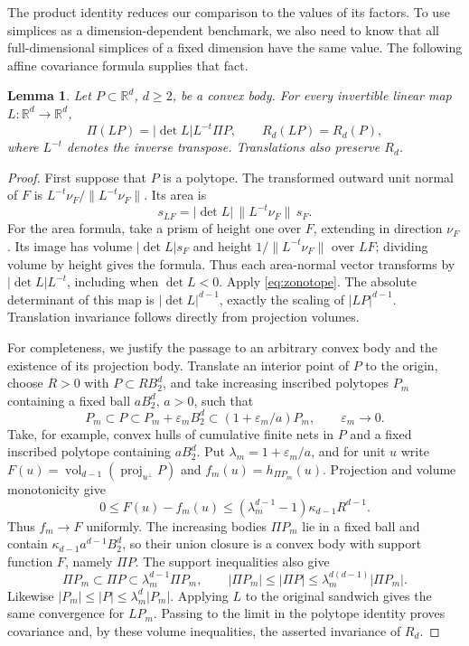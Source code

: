 \documentclass[11pt]{article}
\newtheorem{lemma}[theorem]{Lemma}
\newcommand{\R}{\mathbb R}
\DeclareMathOperator{\vol}{vol}
\DeclareMathOperator{\proj}{proj}
\begin{document}
The product identity reduces our comparison to the values of its factors.
To use simplices as a dimension-dependent benchmark, we also need to
know that all full-dimensional simplices of a fixed dimension have the
same value. The following affine covariance formula supplies that fact.

\begin{lemma}\label{lem:affine}
Let \(P\subset\R^d\), \(d\ge2\), be a convex body. For every
invertible linear map \(L\colon\R^d\to\R^d\),
\[
 \Pi(LP)=|\det L|L^{-t}\Pi P,\qquad R_d(LP)=R_d(P),
\]
where \(L^{-t}\) denotes the inverse transpose. Translations also
preserve \(R_d\).
\end{lemma}

\begin{proof}
First suppose that \(P\) is a polytope.
The transformed outward unit normal of \(F\) is
\(L^{-t}\nu_F/\|L^{-t}\nu_F\|\). Its area is
\[
 s_{LF}=|\det L|\,\|L^{-t}\nu_F\|\,s_F.
\]
For the area formula, take a prism of height one over \(F\), extending
in direction \(\nu_F\). Its image has volume \(|\det L|s_F\) and height
\(1/\|L^{-t}\nu_F\|\) over \(LF\); dividing volume by height gives the
formula. Thus each area-normal vector transforms by
\(|\det L|L^{-t}\), including when \(\det L<0\).
Apply \eqref{eq:zonotope}. The absolute determinant of this map is
\(|\det L|^{d-1}\), exactly the scaling of \(|LP|^{d-1}\).
Translation invariance follows directly from projection volumes.

For completeness, we justify the passage to an arbitrary convex body
and the existence of its projection body. Translate an interior point
of \(P\) to the origin, choose \(R>0\) with \(P\subset RB_2^d\), and
take increasing inscribed polytopes \(P_m\) containing a fixed ball
\(aB_2^d\), \(a>0\), such that
\[
 P_m\subset P\subset P_m+\varepsilon_mB_2^d
 \subset(1+\varepsilon_m/a)P_m,
 \qquad \varepsilon_m\longrightarrow0.
\]
Take, for example, convex hulls of cumulative finite nets in \(P\) and
a fixed inscribed polytope containing \(aB_2^d\). Put
\(\lambda_m=1+\varepsilon_m/a\), and for unit \(u\) write
\(F(u)=\vol_{d-1}(\proj_{u^\perp}P)\) and
\(f_m(u)=h_{\Pi P_m}(u)\). Projection and volume monotonicity give
\[
 0\le F(u)-f_m(u)
 \le (\lambda_m^{d-1}-1)\kappa_{d-1}R^{d-1}.
\]
Thus \(f_m\to F\) uniformly. The increasing bodies \(\Pi P_m\) lie
in a fixed ball and contain \(\kappa_{d-1}a^{d-1}B_2^d\), so their
union closure is a convex body with support function \(F\), namely
\(\Pi P\). The support inequalities also give
\[
 \Pi P_m\subset\Pi P\subset\lambda_m^{d-1}\Pi P_m,
 \qquad
 |\Pi P_m|\le|\Pi P|\le\lambda_m^{d(d-1)}|\Pi P_m|.
\]
Likewise \(|P_m|\le|P|\le\lambda_m^d|P_m|\). Applying \(L\) to
the original sandwich gives the same convergence for \(LP_m\).
Passing to the limit in the polytope identity proves covariance and,
by these volume inequalities, the asserted invariance of \(R_d\).
\end{proof}
\end{document}
